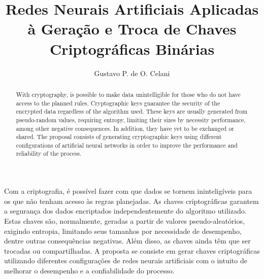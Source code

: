 \documentclass[12pt]{article}
\begin{document}
    \title{
        Redes Neurais Artificiais Aplicadas à Geração e Troca de Chaves Criptográficas Binárias
    }
    
    \author{Gustavo P. de O. Celani}

    \address{
        Instituto Nacional de Telecomunicações (INATEL)\\Santa Rita do Sapucaí - MG, Brasil
    }

    \maketitle

    \begin{abstract}
        With cryptography, is possible to make data unintelligible for those who do not have access to the planned rules. Cryptographic keys guarantee the security of the encrypted data regardless of the algorithm used. These keys are usually generated from pseudo-random values, requiring entropy, limiting their sizes by necessity performance, among other negative consequences. In addition, they have yet to be exchanged or shared. The proposal consists of generating cryptographic keys using different configurations of artificial neural networks in order to improve the performance and reliability of the process.
    \end{abstract}


    \begin{resumo}
        Com a criptografia, é possível fazer com que dados se tornem ininteligíveis para os que não tenham acesso às regras planejadas. As chaves criptográficas garantem a segurança dos dados encriptados independentemente do algoritmo utilizado. Estas chaves são, normalmente, geradas a partir de valores pseudo-aleatórios, exigindo entropia, limitando seus tamanhos por necessidade de desempenho, dentre outras consequências negativas. Além disso, as chaves ainda têm que ser trocadas ou compartilhadas. A proposta se consiste em gerar chaves criptográficas utilizando diferentes configurações de redes neurais artificiais com o intuito de melhorar o desempenho e a confiabilidade do processo.
        
    \end{resumo}
  
\end{document}
